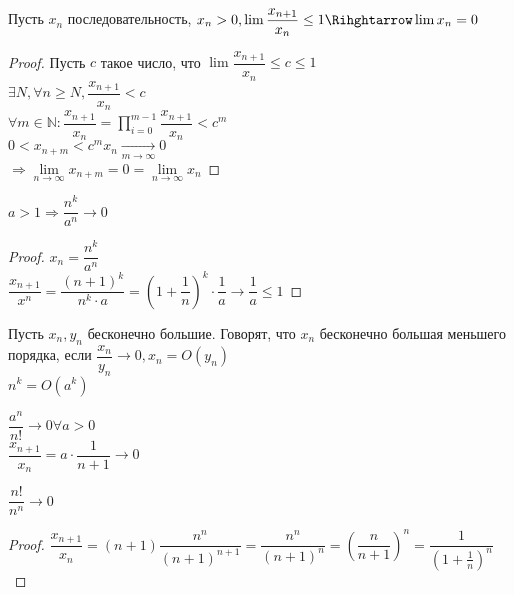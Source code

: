 \Section{}

\begin{theorem}
	Пусть $x_n$ последовательность, $ x_n > 0, \lim \dfrac{x_{n+1}}{x_n} \leq 1 \Rihghtarrow \lim x_n = 0 $
	\begin{proof}
		Пусть $ c $ такое число, что $  \lim \dfrac{x_{n+1}}{x_n} \leq c \leq 1 $ \\
		$ \exists N, \forall n \geq N,  \dfrac{x_{n+1}}{x_n} < c $ \\
		$ \forall m \in \mathbb{N} :  \dfrac{x_{n+1}}{x_n} = \prod_{i=0}^{m-1}  \dfrac{x_{n+1}}{x_n} < c^m $ \\
		$ 0 < x_{n+m} < c^mx_n \underset{m \rightarrow \infty}{\rightarrow} 0 $ \\
		$ \Rightarrow \lim\limits_{n \rightarrow \infty} x_{n+m} = 0 =  \lim\limits_{n \rightarrow \infty} x_{n} $

	\end{proof}
	\begin{consequence}
		$ a > 1 \Rightarrow \dfrac{n^k}{a^n} \rightarrow 0 $
		\begin{proof}
			$ x_n = \dfrac{n^k}{a^n} $ \\
			$ \dfrac{x_{n+1}}{x^n} = \dfrac{(n+1)^k}{n^k \cdot a} = (1 + \dfrac{1}{n})^k \cdot \dfrac{1}{a} \rightarrow \dfrac{1}{a} \leq 1 $
		\end{proof}
	\end{consequence}
\end{theorem}
\begin{definition}
	Пусть $ x_n, y_n $ бесконечно большие. Говорят, что $ x_n $ бесконечно большая меньшего порядка, если $ \dfrac{x_n}{y_n} \rightarrow 0, x_n = O(y_n) $ \\
	$ n^k = O(a^k) $ 
\end{definition}
\begin{consequence}
$ \dfrac{a^n}{n!} \rightarrow 0 \forall a > 0 $ \\

$ \dfrac{x_{n+1}}{x_n} = a \cdot \dfrac{1}{n+1} \rightarrow 0 $ 
\end{consequence}
\begin{consequence}
	$ \dfrac{n!}{n^n} \rightarrow 0 $ \\
	\begin{proof}
		$ \dfrac{x_{n+1}}{x_n} = (n+1)\dfrac{n^n}{(n+1)^{n+1}} = \dfrac{n^n}{(n+1)^n} = (\dfrac{n}{n+1})^n = \dfrac{1}{(1+\frac{1}{n})^n} $
	\end{proof}
	
\end{consequence}

